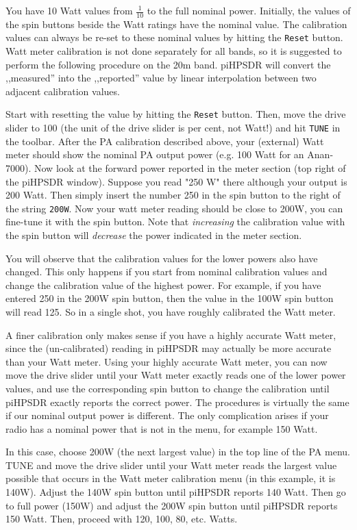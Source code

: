 \documentclass[12pt]{book}
\def\rett#1{\texttt{\color{red}#1}}
\def\pH{pi\-HPSDR\xspace}
\begin{document}
You have 10 Watt values from $\frac{1}{10}$ to the full nominal power. Initially,
the values of the spin buttons beside the Watt ratings have the nominal value.
The calibration values can always be re-set to these nominal values by hitting
the \rett{Reset} button. Watt meter calibration is not done separately for all
bands, so it is suggested to perform the following procedure on the 20m band.
\pH will convert the ,,measured'' into the ,,reported'' value by linear
interpolation between two adjacent calibration values.

Start with resetting the value by hitting the \rett{Reset} button. Then, move the
drive slider to 100 (the unit of the drive slider is per cent, not Watt!) and hit
\texttt{TUNE} in the toolbar.
 After the PA calibration described above, your (external) Watt meter should
show the nominal PA output power (e.g. 100 Watt for an Anan-7000). Now look at the
forward power reported in the meter section (top right of the \pH window).
Suppose you read "250 W" there although your output is 200 Watt. Then simply
insert the number 250 in the spin button to the right of the string
\rett{200W}. Now your watt meter reading should be close to 200W, you can fine-tune
it with the spin button. Note that \textit{increasing} the calibration value
with the spin button will \textit{decrease} the power indicated in the meter section.

You will observe that the calibration values for the lower powers also have changed.
This only happens if you start from nominal calibration values and change the
calibration value of the highest power. For example, if you have entered 250 in
the 200W spin button, then the value in the 100W spin button will read 125. So in a
single shot, you have roughly calibrated the Watt meter.

A finer calibration only makes sense if you have a highly accurate Watt meter, since
the (un-calibrated) reading in \pH may actually be more accurate than your
Watt meter. Using your highly accurate Watt meter,
you can now move the drive slider until your Watt meter exactly reads one of the
lower power values, and use the corresponding spin button to change the calibration
until \pH exactly reports the correct power.
The procedures is  virtually the same if our nominal output power is different.
The only complication arises if your radio has a nominal power that is not in the menu,
for example 150 Watt.

In this case, choose 200W (the next largest value)
in the top line of the PA menu. TUNE and move the drive
slider until your Watt meter reads the largest value possible that occurs
in the Watt meter calibration menu (in this example, it is 140W). Adjust the
140W spin button until \pH reports 140 Watt. Then go to full power
(150W) and adjust the 200W spin button until \pH reports 150 Watt.
Then, proceed with 120, 100, 80, etc. Watts.
\end{document}
